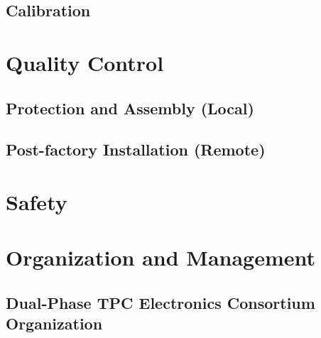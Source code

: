 \subsection{Calibration}
\label{sec:fddp-tpc-elec-install-calib}

\section{Quality Control}
\label{sec:fddp-tpc-elec-qc}

\subsection{Protection and Assembly (Local)}
\label{sec:fddp-tpc-elec-qc-local}


\subsection{Post-factory Installation (Remote)}
\label{sec:fddp-tpc-elec-qc-remote}


\section{Safety}
\label{sec:fddp-tpc-elec-safety}





\section{Organization and Management}
\label{sec:fddp-tpc-elec-org}

\subsection{Dual-Phase TPC Electronics Consortium Organization}
\label{sec:fddp-tpc-elec-org-consortium}

